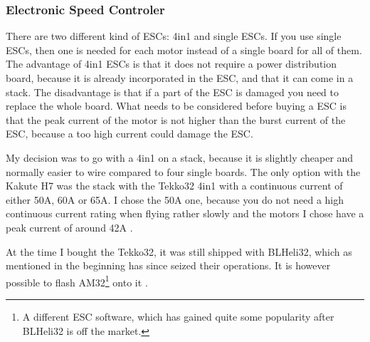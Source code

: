 \documentclass[svgnames]{article}
\begin{document}
	\subsubsection[ESC]{Electronic Speed Controler}
	There are two different kind of \gls{ESC}s: 4in1 and single \glspl{ESC}. If you use single \gls{ESC}s, then one is needed for each motor instead of a single board for all of them. The advantage of 4in1 \gls{ESC}s is that it does not require a power distribution board, because it is already incorporated in the \gls{ESC}, and that it can come in a stack. The disadvantage is that if a part of the \gls{ESC} is damaged you need to replace the whole board. What needs to be considered before buying a \gls{ESC} is that the peak current of the motor is not higher than the burst current of the \gls{ESC}, because a too high current could damage the \gls{ESC}.
	
	My decision was to go with a 4in1 on a stack, because it is slightly cheaper and normally easier to wire compared to four single boards. The only option with the Kakute H7 was the stack with the Tekko32 4in1 with a continuous current of either 50A, 60A or 65A. I chose the 50A one, because you do not need a high continuous current rating when flying rather slowly and the motors I chose have a peak current of around 42A \cite{Tekko32}. 
	
	At the time I bought the Tekko32, it was still shipped with BLHeli32, which as mentioned in the beginning has since seized their operations. It is however possible to flash AM32\footnote{A different \gls{ESC} software, which has gained quite some popularity after BLHeli32 is off the market.} onto it \cite{AM32}.
\end{document}
